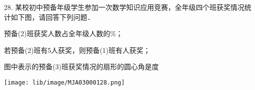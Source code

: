 28. 某校初中预备年级学生参加一次数学知识应用竞赛，全年级四个班获奖情况统计如下图，请回答下列问题．

\begin{subquestions}

    \subquestion 预备(2)班获奖人数占全年级人数的\key{\hspace{1cm}}$\%$；

    \subquestion 若预备(2)班有5人获奖，则预备(1)班有\key{\hspace{1cm}}人获奖；

    \subquestion 图中表示的预备(3)班获奖情况的扇形的圆心角是\key{\hspace{1cm}}度

\end{subquestions}



\begin{center}

    \texttt{[image: lib/image/MJA03000128.png]}

\end{center}



